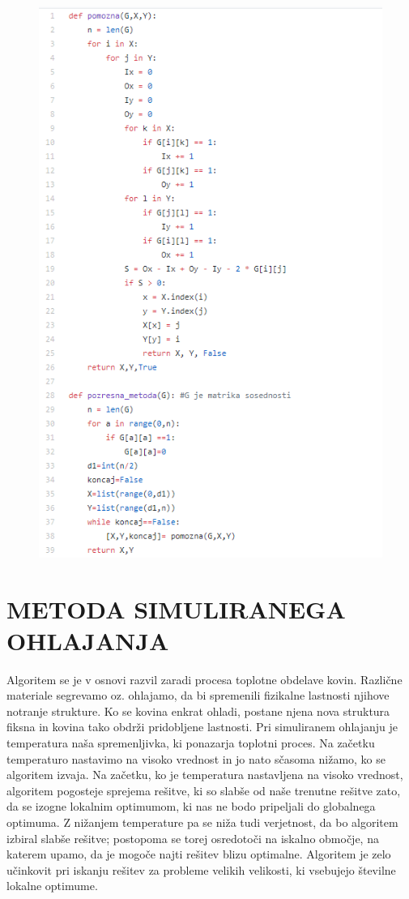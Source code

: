 \documentclass[12pt,a4paper]{amsart}
\theoremstyle{definition} %
\theoremstyle{plain} %
\begin{document}
\FloatBarrier
\begin{figure}
  \centering
  \includegraphics{pozresna}
\end{figure}
\FloatBarrier

\section{\textbf{METODA SIMULIRANEGA OHLAJANJA}}
Algoritem se je v osnovi razvil zaradi procesa toplotne obdelave kovin. Različne materiale segrevamo oz. ohlajamo, da bi spremenili fizikalne lastnosti njihove notranje strukture. Ko se kovina enkrat ohladi, postane njena nova struktura fiksna in kovina tako obdrži pridobljene lastnosti. Pri simuliranem ohlajanju je temperatura naša spremenljivka, ki ponazarja toplotni proces. Na začetku temperaturo nastavimo na visoko vrednost in jo nato sčasoma nižamo, ko se algoritem izvaja. Na začetku, ko je temperatura nastavljena na visoko vrednost, algoritem pogosteje sprejema rešitve, ki so slabše od naše trenutne rešitve zato, da se izogne lokalnim optimumom, ki nas ne bodo pripeljali do globalnega optimuma. Z nižanjem temperature pa se niža tudi verjetnost, da bo algoritem izbiral slabše rešitve; postopoma se torej osredotoči na iskalno območje, na katerem upamo, da je mogoče najti rešitev blizu optimalne. Algoritem je zelo učinkovit pri iskanju rešitev za probleme velikih velikosti, ki vsebujejo številne lokalne optimume.
\end{document}
